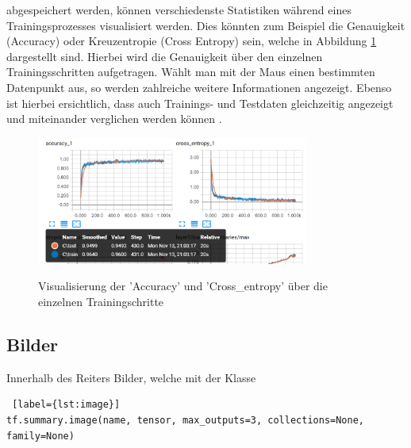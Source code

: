 \vspace{0.2cm}

abgespeichert werden, können verschiedenste Statistiken während eines Trainingsprozesses visualisiert werden. Dies könnten zum Beispiel die Genauigkeit (Accuracy) oder Kreuzentropie (Cross Entropy) sein, welche in Abbildung \ref{fig:skalare} dargestellt sind. Hierbei wird die Genauigkeit über den einzelnen Trainingsschritten aufgetragen. Wählt man mit der Maus einen bestimmten Datenpunkt aus, so werden zahlreiche weitere Informationen angezeigt. Ebenso ist hierbei ersichtlich, dass auch Trainings- und Testdaten gleichzeitig angezeigt und miteinander verglichen werden können \cite{tensorboard.2017}.

\vspace{0.3cm}
\begin{figure}[h!]
	\centering
	 \includegraphics[width=0.8\textwidth]{images/Kapitel_3/skalars.png}\\
	\vspace{10pt} 
	\caption[Visualisierung der 'Accuracy' und 'Cross\_entropy' über die einzelnen Trainingsschritte]{Visualisierung der 'Accuracy' und 'Cross\_entropy' über die einzelnen Trainingschritte}
	\label{fig:skalare}
\end{figure}





\subsection{Bilder}

Innerhalb des Reiters Bilder, welche mit der Klasse

\vspace{0.6cm}
\begin{minipage}{\linewidth}
\begin{lstlisting} [label={lst:image}]
tf.summary.image(name, tensor, max_outputs=3, collections=None, family=None)
\end{lstlisting}
\end{minipage}
\vspace{0.3cm}

